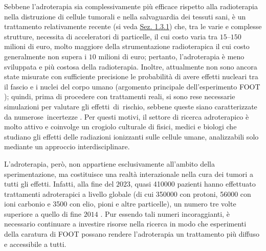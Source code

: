 \documentclass[12pt,a4paper,twoside]{report}
\begin{document}
	Sebbene l'adroterapia sia complessivamente più efficace rispetto alla radioterapia nella distruzione di cellule tumorali e nella salvaguardia dei tessuti sani, è un trattamento relativamente recente (si veda \hyperref[sec:storia_adroterapia]{Sez. 1.3.1}) che, tra le varie e complesse strutture, necessita di acceleratori di particelle, il cui costo varia tra $15$--$150$ milioni di euro, molto maggiore della strumentazione radioterapica il cui costo generalmente non supera i $10$ milioni di euro; pertanto, l'adroterapia è meno sviluppata e più costosa della radioterapia. Inoltre, attualmente non sono ancora state misurate con sufficiente precisione le probabilità di avere effetti nucleari tra il fascio e i nuclei del corpo umano (argomento principale dell'esperimento FOOT \cite{foot_site}); quindi, prima di procedere con trattamenti reali, si sono rese necessarie simulazioni per valutare gli effetti di rischio, sebbene queste siano caratterizzate da numerose incertezze \cite{foot_cdr}. Per questi motivi, il settore di ricerca adroterapico è molto attivo e coinvolge un crogiolo culturale di fisici, medici e biologi che studiano gli effetti delle radiazioni ionizzanti sulle cellule umane, analizzabili solo mediante un approccio interdisciplinare.
	
	L'adroterapia, però, non appartiene esclusivamente all'ambito della sperimentazione, ma costituisce una realtà interazionale nella cura dei tumori a tutti gli effetti. Infatti, alla fine del $2023$, quasi \num{410000} pazienti hanno effettuato trattamenti adroterapici a livello globale (di cui \num{350000} con protoni, \num{56000} con ioni carbonio e \num{3500} con elio, pioni e altre particelle), un numero tre volte superiore a quello di fine $2014$ \cite{PTCOG}. Pur essendo tali numeri incoraggianti, è necessario continuare a investire risorse nella ricerca in modo che esperimenti della caratura di FOOT possano rendere l'adroterapia un trattamento più diffuso e accessibile a tutti.
	
\end{document}
